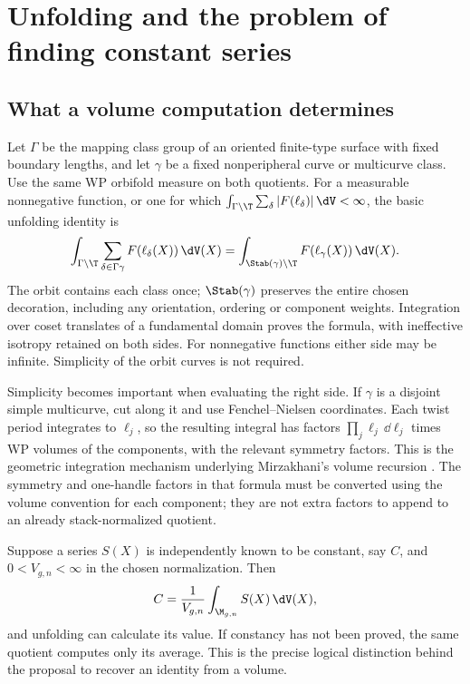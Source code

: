 \section{Unfolding and the problem of finding constant series}
\label{sec:unfolding}

\subsection{What a volume computation determines}

Let $\Gamma$ be the mapping class group of an oriented finite-type surface
with fixed boundary lengths, and let $\gamma$ be a fixed nonperipheral
curve or multicurve class. Use the same WP orbifold measure on both
quotients. For a measurable nonnegative function, or one for which
$\int_{\Gamma\backslash\T}\sum_\delta|F(\ell_\delta)|\,\dV<\infty$,
the basic unfolding identity is
\begin{equation}
 \int_{\Gamma\backslash\T}
 \sum_{\delta\in\Gamma\gamma}F(\ell_\delta(X))\,\dV(X)
 =\int_{\Stab(\gamma)\backslash\T}
             F(\ell_\gamma(X))\,\dV(X).
 \label{eq:unfold}
\end{equation}
The orbit contains each class once; $\Stab(\gamma)$ preserves the entire
chosen decoration, including any orientation, ordering or component
weights. Integration over coset translates of a fundamental domain proves
the formula, with ineffective isotropy retained on both sides. For
nonnegative functions either side may be infinite. Simplicity of the
orbit curves is not required.

Simplicity becomes important when evaluating the right side. If $\gamma$
is a disjoint simple multicurve, cut along it and use Fenchel--Nielsen
coordinates. Each twist period integrates to $\ell_j$, so the resulting
integral has factors $\prod_j\ell_j\,\dd\ell_j$ times WP volumes of the
components, with the relevant symmetry factors. This is the geometric
integration mechanism underlying Mirzakhani's volume recursion
\cite[Theorem 7.1 and Lemma 7.3]{MirzVolumes}. The symmetry and
one-handle factors in that formula must be converted using the volume
convention for each component; they are not extra factors to append to
an already stack-normalized quotient.

Suppose a series $S(X)$ is independently known to be constant, say $C$,
and $0<V_{g,n}<\infty$ in the chosen normalization.
Then
\begin{equation}
 C=\frac{1}{V_{g,n}}
       \int_{\M_{g,n}}S(X)\,\dV(X),
 \label{eq:recoverconstant}
\end{equation}
and unfolding can calculate its value. If constancy has not been proved,
the same quotient computes only its average. This is the precise logical
distinction behind the proposal to recover an identity from a volume.

